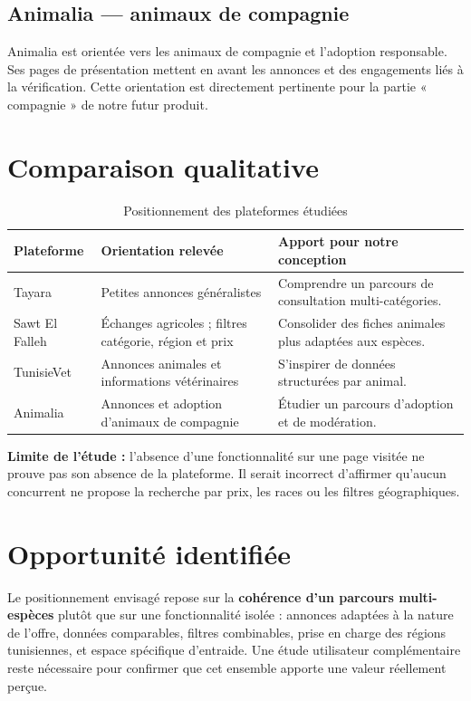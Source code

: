 \subsection{Animalia --- animaux de compagnie}
Animalia est orientée vers les animaux de compagnie et l’adoption responsable. Ses pages de présentation mettent en avant les annonces et des engagements liés à la vérification. Cette orientation est directement pertinente pour la partie « compagnie » de notre futur produit.\par
{}

\section{Comparaison qualitative}
\begin{table}[htbp]
\centering\small
\caption{Positionnement des plateformes étudiées}
\label{tab:comparatif}
\begin{tabularx}{\textwidth}{@{}P{31mm}Y Y@{}}
\toprule
\textbf{Plateforme} & \textbf{Orientation relevée} & \textbf{Apport pour notre conception} \\
\midrule
Tayara & Petites annonces généralistes & Comprendre un parcours de consultation multi-catégories.\\
Sawt El Falleh & Échanges agricoles ; filtres catégorie, région et prix & Consolider des fiches animales plus adaptées aux espèces.\\
TunisieVet & Annonces animales et informations vétérinaires & S’inspirer de données structurées par animal.\\
Animalia & Annonces et adoption d’animaux de compagnie & Étudier un parcours d’adoption et de modération.\\
\bottomrule
\end{tabularx}
\end{table}

\begin{warningbox}
\textbf{Limite de l’étude :} l’absence d’une fonctionnalité sur une page visitée ne prouve pas son absence de la plateforme. Il serait incorrect d’affirmer qu’aucun concurrent ne propose la recherche par prix, les races ou les filtres géographiques.
\end{warningbox}

\section{Opportunité identifiée}
Le positionnement envisagé repose sur la \textbf{cohérence d’un parcours multi-espèces} plutôt que sur une fonctionnalité isolée : annonces adaptées à la nature de l’offre, données comparables, filtres combinables, prise en charge des régions tunisiennes, et espace spécifique d’entraide. Une étude utilisateur complémentaire reste nécessaire pour confirmer que cet ensemble apporte une valeur réellement perçue.

